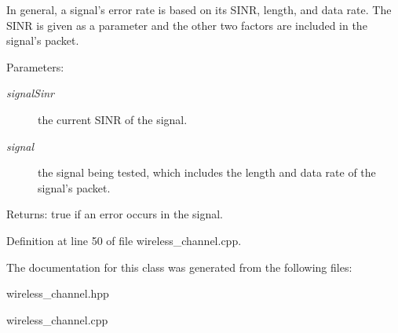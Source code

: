 In general, a signal's error rate is based on its SINR, length, and data rate. The SINR is given as a parameter and the other two factors are included in the signal's packet. \begin{Desc}
\item[Parameters:]
\begin{description}
\item[{\em signal\-Sinr}]the current SINR of the signal. \item[{\em signal}]the signal being tested, which includes the length and data rate of the signal's packet. \end{description}
\end{Desc}
\begin{Desc}
\item[Returns:]true if an error occurs in the signal. \end{Desc}


Definition at line 50 of file wireless\_\-channel.cpp.

The documentation for this class was generated from the following files:\begin{CompactItemize}
\item 
wireless\_\-channel.hpp\item 
wireless\_\-channel.cpp\end{CompactItemize}

